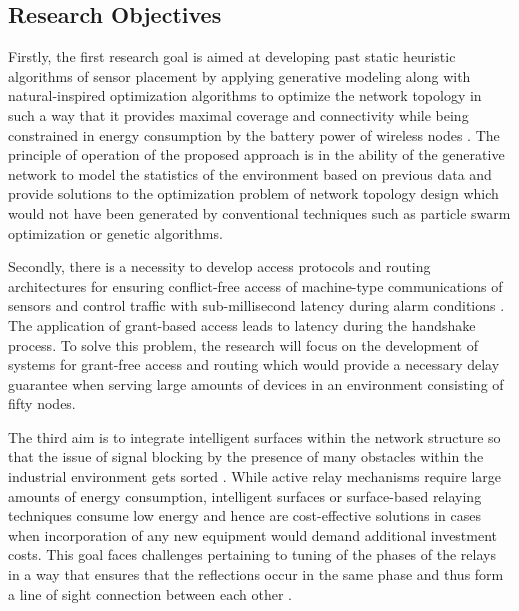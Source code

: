 \documentclass[a4paper,fleqn]{cas-dc}
\numberwithin{equation}{section}
\begin{document}
\subsection{Research Objectives}

Firstly, the first research goal is aimed at developing past static heuristic algorithms of sensor placement by applying generative modeling along with natural-inspired optimization algorithms to optimize the network topology in such a way that it provides maximal coverage and connectivity while being constrained in energy consumption by the battery power of wireless nodes \cite{b2, He_2025_GAN_Design}. The principle of operation of the proposed approach is in the ability of the generative network to model the statistics of the environment based on previous data and provide solutions to the optimization problem of network topology design which would not have been generated by conventional techniques such as particle swarm optimization or genetic algorithms.

Secondly, there is a necessity to develop access protocols and routing architectures for ensuring conflict-free access of machine-type communications of sensors and control traffic with sub-millisecond latency during alarm conditions \cite{b5, Ginige_2025_AdmissionControl, Popovski_2024_Slicing}. The application of grant-based access leads to latency during the handshake process. To solve this problem, the research will focus on the development of systems for grant-free access and routing which would provide a necessary delay guarantee when serving large amounts of devices in an environment consisting of fifty nodes.

The third aim is to integrate intelligent surfaces within the network structure so that the issue of signal blocking by the presence of many obstacles within the industrial environment gets sorted \cite{b4}. While active relay mechanisms require large amounts of energy consumption, intelligent surfaces or surface-based relaying techniques consume low energy and hence are cost-effective solutions in cases when incorporation of any new equipment would demand additional investment costs. This goal faces challenges pertaining to tuning of the phases of the relays in a way that ensures that the reflections occur in the same phase and thus form a line of sight connection between each other \cite{Wu_2024_RIS_Reliability, Chen_2024_RIS_Security}.
\end{document}
